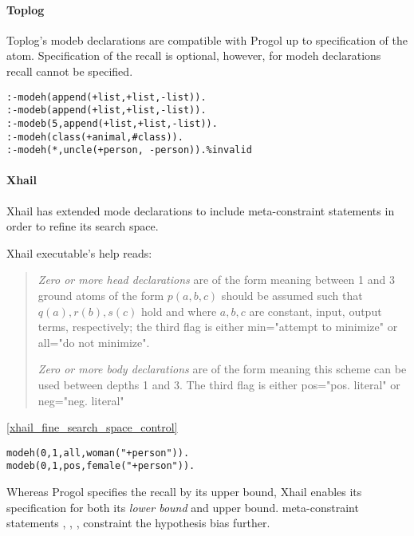 \paragraph{Toplog}
Toplog's modeb declarations are compatible with Progol up to specification of the atom. Specification of the recall is optional, however, for modeh declarations recall cannot be specified\cite{santos2008toplogWebsite}.
\begin{exmp}\cite{santos2008toplogWebsite}
\begin{lstlisting}
:-modeh(append(+list,+list,-list)).
:-modeb(append(+list,+list,-list)).
:-modeb(5,append(+list,+list,-list)).
:-modeh(class(+animal,#class)).
:-modeh(*,uncle(+person, -person)).%invalid
\end{lstlisting}
\end{exmp}

\paragraph{Xhail}\label{xhail_mode_declarations}
Xhail has extended mode declarations to include meta-constraint statements in order to refine its search space.

Xhail executable's help\cite{ray2007xhail} reads:
\begin{quote}
\emph{Zero or more head declarations} are of the form
 meaning between 1 and 3 ground atoms
 of the form $p(a,b,c)$ should be assumed such that $q(a), r(b), s(c)$ hold 
 and where $a, b, c$ are constant, input, output terms, respectively;
 the third flag is either min="attempt to minimize" or all="do not minimize".
 
\emph{Zero or more body declarations} are of the form  meaning this scheme can be used between 
 depths 1 and 3.  The third flag is either pos="pos. literal" or neg="neg. literal" 
\end{quote}

\begin{exmp}\ref{xhail_fine_search_space_control}
\begin{lstlisting}
modeh(0,1,all,woman("+person")).
modeb(0,1,pos,female("+person")).
\end{lstlisting}
\end{exmp}

Whereas Progol specifies the recall by its upper bound, Xhail enables its specification for both its \emph{lower bound} and upper bound. meta-constraint statements
, , ,  constraint the hypothesis bias further.

